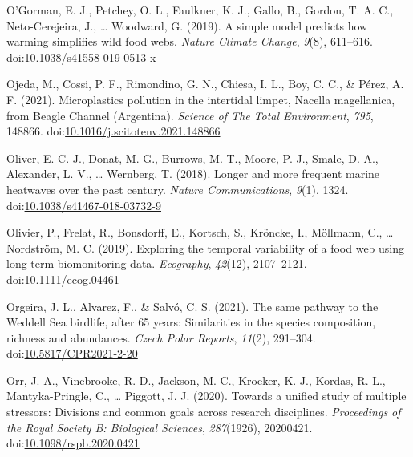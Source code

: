 \documentclass[
]{article}
\newlength{\cslhangindent}
\newlength{\cslentryspacingunit} %
\newenvironment{CSLReferences}[2] %
 {%
  \setlength{\parindent}{0pt}
  \ifodd #1
  \let\oldpar\par
  \def\par{\hangindent=\cslhangindent\oldpar}
  \fi
  \setlength{\parskip}{#2\cslentryspacingunit}
 }%
 {}
\begin{document}
\begin{CSLReferences}{1}{0}
\leavevmode{}%
O'Gorman, E. J., Petchey, O. L., Faulkner, K. J., Gallo, B., Gordon, T.
A. C., Neto-Cerejeira, J., \ldots{} Woodward, G. (2019). A simple model
predicts how warming simplifies wild food webs. \emph{Nature Climate
Change}, \emph{9}(8), 611--616.
doi:\href{https://doi.org/10.1038/s41558-019-0513-x}{10.1038/s41558-019-0513-x}

\leavevmode{}%
Ojeda, M., Cossi, P. F., Rimondino, G. N., Chiesa, I. L., Boy, C. C., \&
Pérez, A. F. (2021). Microplastics pollution in the intertidal limpet,
{Nacella} magellanica, from {Beagle Channel} ({Argentina}).
\emph{Science of The Total Environment}, \emph{795}, 148866.
doi:\href{https://doi.org/10.1016/j.scitotenv.2021.148866}{10.1016/j.scitotenv.2021.148866}

\leavevmode{}%
Oliver, E. C. J., Donat, M. G., Burrows, M. T., Moore, P. J., Smale, D.
A., Alexander, L. V., \ldots{} Wernberg, T. (2018). Longer and more
frequent marine heatwaves over the past century. \emph{Nature
Communications}, \emph{9}(1), 1324.
doi:\href{https://doi.org/10.1038/s41467-018-03732-9}{10.1038/s41467-018-03732-9}

\leavevmode{}%
Olivier, P., Frelat, R., Bonsdorff, E., Kortsch, S., Kröncke, I.,
Möllmann, C., \ldots{} Nordström, M. C. (2019). Exploring the temporal
variability of a food web using long-term biomonitoring data.
\emph{Ecography}, \emph{42}(12), 2107--2121.
doi:\href{https://doi.org/10.1111/ecog.04461}{10.1111/ecog.04461}

\leavevmode{}%
Orgeira, J. L., Alvarez, F., \& Salvó, C. S. (2021). The same pathway to
the {Weddell Sea} birdlife, after 65 years: Similarities in the species
composition, richness and abundances. \emph{Czech Polar Reports},
\emph{11}(2), 291--304.
doi:\href{https://doi.org/10.5817/CPR2021-2-20}{10.5817/CPR2021-2-20}

\leavevmode{}%
Orr, J. A., Vinebrooke, R. D., Jackson, M. C., Kroeker, K. J., Kordas,
R. L., Mantyka-Pringle, C., \ldots{} Piggott, J. J. (2020). Towards a
unified study of multiple stressors: Divisions and common goals across
research disciplines. \emph{Proceedings of the Royal Society B:
Biological Sciences}, \emph{287}(1926), 20200421.
doi:\href{https://doi.org/10.1098/rspb.2020.0421}{10.1098/rspb.2020.0421}


\end{CSLReferences}
\end{document}
